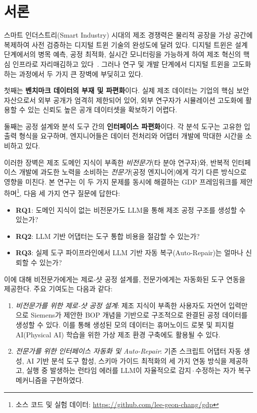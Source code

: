 \documentclass[conference]{IEEEtran}
\begin{document}
\section{서론}

스마트 인더스트리(Smart Industry) 시대의 제조 경쟁력은 물리적 공장을 가상 공간에 복제하여 사전 검증하는 디지털 트윈 기술의 완성도에 달려 있다. 디지털 트윈은 설계 단계에서의 병목 예측, 공정 최적화, 실시간 모니터링을 가능하게 하여 제조 혁신의 핵심 인프라로 자리매김하고 있다~\cite{b1}. 그러나 연구 및 개발 단계에서 디지털 트윈을 고도화하는 과정에서 두 가지 큰 장벽에 부딪히고 있다.

첫째는 \textbf{벤치마크 데이터의 부재 및 파편화}이다. 실제 제조 데이터는 기업의 핵심 보안 자산으로서 외부 공개가 엄격히 제한되어 있어, 외부 연구자가 시뮬레이션 고도화에 활용할 수 있는 신뢰도 높은 공개 데이터셋을 확보하기 어렵다.

둘째는 공정 설계와 분석 도구 간의 \textbf{인터페이스 파편화}이다. 각 분석 도구는 고유한 입출력 형식을 요구하며, 엔지니어들은 데이터 전처리와 어댑터 개발에 막대한 시간을 소비하고 있다.

이러한 장벽은 제조 도메인 지식이 부족한 \textit{비전문가}(타 분야 연구자)와, 반복적 인터페이스 개발에 과도한 노력을 소비하는 \textit{전문가}(공정 엔지니어)에게 각기 다른 방식으로 영향을 미친다. 본 연구는 이 두 가지 문제를 동시에 해결하는 GDP 프레임워크를 제안하며\footnote{소스 코드 및 실험 데이터: \url{https://github.com/lee-geon-chang/gdp}}, 다음 세 가지 연구 질문에 답한다:

\begin{itemize}
\item \textbf{RQ1}: 도메인 지식이 없는 비전문가도 LLM을 통해 제조 공정 구조를 생성할 수 있는가?
\item \textbf{RQ2}: LLM 기반 어댑터는 도구 통합 비용을 절감할 수 있는가?
\item \textbf{RQ3}: 실제 도구 파이프라인에서 LLM 기반 자동 복구(Auto-Repair)는 얼마나 신뢰할 수 있는가?
\end{itemize}

이에 대해 비전문가에게는 제로-샷 공정 설계를, 전문가에게는 자동화된 도구 연동을 제공한다. 주요 기여도는 다음과 같다:

\begin{enumerate}
\item \textit{비전문가를 위한 제로-샷 공정 설계}: 제조 지식이 부족한 사용자도 자연어 입력만으로 Siemens가 제안한 BOP 개념을 기반으로 구조적으로 완결된 공정 데이터를 생성할 수 있다. 이를 통해 생성된 모의 데이터는 휴머노이드 로봇 및 피지컬 AI(Physical AI) 학습을 위한 가상 제조 환경 구축에도 활용될 수 있다.

\item \textit{전문가를 위한 인터페이스 자동화 및 Auto-Repair}: 기존 스크립트 어댑터 자동 생성, AI 기반 분석 도구 합성, 스키마 가이드 최적화의 세 가지 연동 방식을 제공하고, 실행 중 발생하는 런타임 에러를 LLM이 자율적으로 감지\,$\cdot$\,수정하는 자가 복구 메커니즘을 구현하였다.
\end{enumerate}
\end{document}
